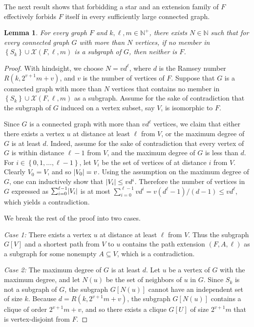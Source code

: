 \documentclass[11pt]{article}
\newtheorem{lemma}[theorem]{Lemma}
\theoremstyle{definition}
\theoremstyle{remark}
\DeclarePairedDelimiter\abs{\lvert}{\rvert}
\newcommand{\sset}[1]{\left\{{#1}\right\}}
\newcommand{\N}{\mathbb{N}}
\newcommand{\X}{\mathcal{X}}
\begin{document}
The next result shows that forbidding a star and an extension family of $F$ effectively forbids $F$ itself in every sufficiently large connected graph.

\begin{lemma} \label{lem:forbid-extensions}
    For every graph $F$ and $k, \ell, m \in \N^+$, there exists $N \in \N$ such that for every connected graph $G$ with more than $N$ vertices, if no member in $\sset{S_k} \cup \X(F, \ell, m)$ is a subgraph of $G$, then neither is $F$.
\end{lemma}

\begin{proof}
    With hindsight, we choose $N = vd^{\ell}$, where $d$ is the Ramsey number $R(k, 2^{v + 1}m + v)$, and $v$ is the number of vertices of $F$. Suppose that $G$ is a connected graph with more than $N$ vertices that contains no member in $\sset{S_k} \cup \X(F, \ell, m)$ as a subgraph. Assume for the sake of contradiction that the subgraph of $G$ induced on a vertex subset, say $V$, is isomorphic to $F$.
    
    Since $G$ is a connected graph with more than $vd^{\ell}$ vertices, we claim that either there exists a vertex $u$ at distance at least $\ell$ from $V$, or the maximum degree of $G$ is at least $d$. Indeed, assume for the sake of contradiction that every vertex of $G$ is within distance $\ell-1$ from $V$, and the maximum degree of $G$ is less than $d$. For $i \in \sset{0, 1, \dots, \ell-1}$, let $V_i$ be the set of vertices of at distance $i$ from $V$. Clearly $V_0 = V$, and so $\abs{V_0} = v$. Using the assumption on the maximum degree of $G$, one can inductively show that $\abs{V_i} \le vd^i$. Therefore the number of vertices in $G$ expressed as $\sum_{i = 0}^{\ell - 1}\abs{V_i}$ is at most $\sum_{i=0}^{\ell - 1}vd^i = v(d^\ell - 1)/(d-1) \le vd^\ell$, which yields a contradiction.
    
    We break the rest of the proof into two cases.

    \bigskip
    \noindent\textit{Case 1:} There exists a vertex $u$ at distance at least $\ell$ from $V$. Thus the subgraph $G[V]$ and a shortest path from $V$ to $u$ contains the path extension $(F, A, \ell)$ as a subgraph for some nonempty $A \subseteq V$, which is a contradiction.

    \bigskip
    \noindent\textit{Case 2:} The maximum degree of $G$ is at least $d$. Let $u$ be a vertex of $G$ with the maximum degree, and let $N(u)$ be the set of neighbors of $u$ in $G$. Since $S_k$ is not a subgraph of $G$, the subgraph $G[N(u)]$ cannot have an independent set of size $k$. Because $d = R(k, 2^{v + 1}m + v)$, the subgraph $G[N(u)]$ contains a clique of order $2^{v + 1}m + v$, and so there exists a clique $G[U]$ of size $2^{v + 1}m$ that is vertex-disjoint from $F$.
    

\end{proof}
\end{document}
